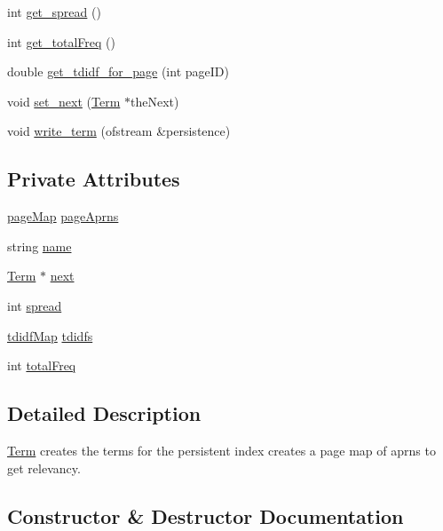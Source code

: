 \begin{DoxyCompactItemize}
int \hyperlink{class_term_a3b708fc85a3b272d67558600711aca05}{get\+\_\+spread} ()
\item 
int \hyperlink{class_term_a41a8474eb94c1e2e951d23fe164aecd6}{get\+\_\+total\+Freq} ()
\item 
double \hyperlink{class_term_aae2effee196de73962a33d85aeca914c}{get\+\_\+tdidf\+\_\+for\+\_\+page} (int page\+I\+D)
\item 
void \hyperlink{class_term_a2f963514bfacc52e654c94793e25e3d4}{set\+\_\+next} (\hyperlink{class_term}{Term} $\ast$the\+Next)
\item 
void \hyperlink{class_term_ae0e0bd5c7411fa03aeb2c92464dd921b}{write\+\_\+term} (ofstream \&persistence)
\end{DoxyCompactItemize}
\subsection*{Private Attributes}
\begin{DoxyCompactItemize}
\item 
\hyperlink{avltreeinterface_8h_afdba5c4962a1c0abdda6ca3e414a9a45}{page\+Map} \hyperlink{class_term_a8e3efcdc519a46da74930a8a4dba9398}{page\+Aprns}
\item 
string \hyperlink{class_term_a1ea7886ca15ad219ce8751bc30099483}{name}
\item 
\hyperlink{class_term}{Term} $\ast$ \hyperlink{class_term_a32dadebc2046b21eb097d56795a977a4}{next}
\item 
int \hyperlink{class_term_abb3f8b30ce0f7cb8a64b84084b822e43}{spread}
\item 
\hyperlink{term_8h_af4400159d8a0a2894541b3d38edabf6c}{tdidf\+Map} \hyperlink{class_term_a8a6d9637da60e1200bb91b5108c601b5}{tdidfs}
\item 
int \hyperlink{class_term_a075587aedd4009c7c207dc3fdd5b33cd}{total\+Freq}
\end{DoxyCompactItemize}


\subsection{Detailed Description}
\hyperlink{class_term}{Term} creates the terms for the persistent index creates a page map of aprns to get relevancy. 

\subsection{Constructor \& Destructor Documentation}
\hypertarget{class_term_a6943005db5b7e5ca84afcb54a5862d42}{}
